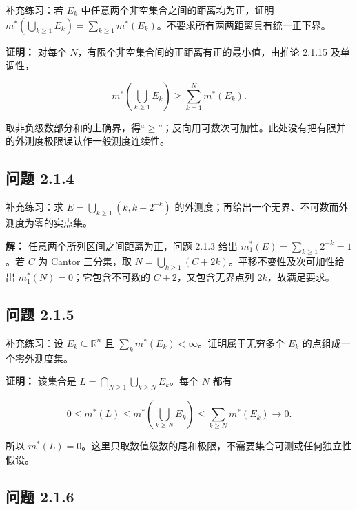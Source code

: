 \documentclass[11pt,a4paper]{article}
\begin{document}
补充练习：若 \(E_k\) 中任意两个非空集合之间的距离均为正，证明
\(m^*(\bigcup_{k\ge1}E_k)=\sum_{k\ge1}m^*(E_k)\)。不要求所有两两距离具有统一正下界。

\textbf{证明：} 对每个
\(N\)，有限个非空集合间的正距离有正的最小值，由推论 2.1.15 及单调性，

\begin{equation*}
m^*\left(\bigcup_{k\ge1}E_k\right)\ge\sum_{k=1}^Nm^*(E_k).
\tag{2.1.24}
\end{equation*}

取非负级数部分和的上确界，得``\(\ge\)''；反向用可数次可加性。此处没有把有限并的外测度极限误认作一般测度连续性。

\subsection{问题 2.1.4}\label{ux95eeux9898-2.1.4}

补充练习：求 \(E=\bigcup_{k\ge1}(k,k+2^{-k})\)
的外测度；再给出一个无界、不可数而外测度为零的实点集。

\textbf{解：} 任意两个所列区间之间距离为正，问题 2.1.3 给出
\(m_1^*(E)=\sum_{k\ge1}2^{-k}=1\)。若 \(C\) 为 Cantor 三分集，取
\(N=\bigcup_{k\ge1}(C+2k)\)。平移不变性及次可加性给出
\(m_1^*(N)=0\)；它包含不可数的 \(C+2\)，又包含无界点列
\(2k\)，故满足要求。

\subsection{问题 2.1.5}\label{ux95eeux9898-2.1.5}

补充练习：设 \(E_k\subseteq\mathbb R^n\) 且
\(\sum_km^*(E_k)<\infty\)。证明属于无穷多个 \(E_k\)
的点组成一个零外测度集。

\textbf{证明：} 该集合是 \(L=\bigcap_{N\ge1}\bigcup_{k\ge N}E_k\)。每个
\(N\) 都有

\begin{equation*}
0\le m^*(L)\le m^*\left(\bigcup_{k\ge N}E_k\right)
\le\sum_{k\ge N}m^*(E_k)\longrightarrow0.
\tag{2.1.25}
\end{equation*}

所以
\(m^*(L)=0\)。这里只取数值级数的尾和极限，不需要集合可测或任何独立性假设。

\subsection{问题 2.1.6}\label{ux95eeux9898-2.1.6}
\end{document}
